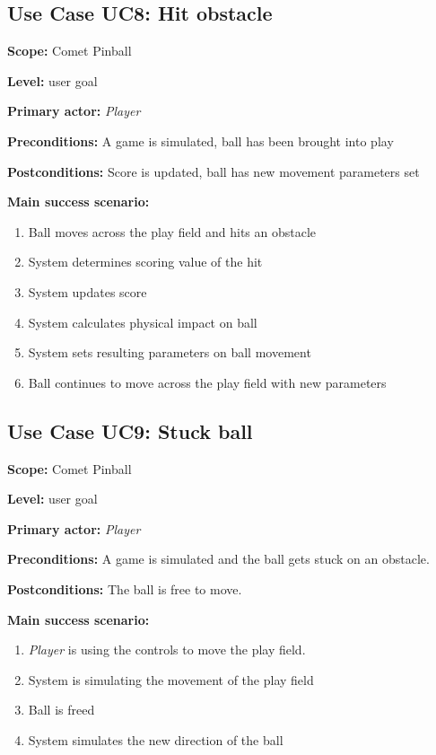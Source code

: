 \documentclass[fontsize=12pt,
               paper=a4,
               twoside=false,
               parskip=half,
               ]{scrartcl}
\begin{document}


\subsection{Use Case UC8: Hit obstacle}

\textbf{\textsf{Scope:}} Comet Pinball

\textbf{\textsf{Level:}} user goal

\textbf{\textsf{Primary actor:}} \emph{Player}

\textbf{\textsf{Preconditions:}} A game is simulated, ball has been brought into play

\textbf{\textsf{Postconditions:}} Score is updated, ball has new movement parameters set

\textbf{\textsf{Main success scenario:}}

\begin{enumerate}[leftmargin=3em]
	\item Ball moves across the play field and hits an obstacle
	\item System determines scoring value of the hit
	\item System updates score
	\item System calculates physical impact on ball
	\item System sets resulting parameters on ball movement
	\item Ball continues to move across the play field with new parameters
\end{enumerate}




\subsection{Use Case UC9: Stuck ball}

\textbf{\textsf{Scope:}} Comet Pinball

\textbf{\textsf{Level:}} user goal

\textbf{\textsf{Primary actor:}} \emph{Player}

\textbf{\textsf{Preconditions:}} A game is simulated and the ball gets stuck on an obstacle.

\textbf{\textsf{Postconditions:}} The ball is free to move.

\textbf{\textsf{Main success scenario:}}

\begin{enumerate}[leftmargin=3em]
	\item \emph{Player} is using the controls to move the play field.
	\item System is simulating the movement of the play field
	\item Ball is freed
	\item System simulates the new direction of the ball
\end{enumerate}
\end{document}
